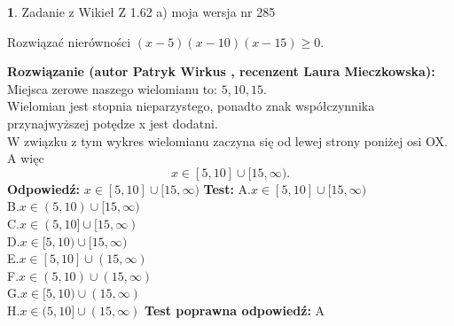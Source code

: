\documentclass[12pt, a4paper]{article}
\theoremstyle{definition} %
\newtheorem{zad}{}
\newcommand{\zadStart}[1]{\begin{zad}#1\newline}
\newcommand{\zadStop}{\end{zad}}
\newcommand{\rozwStart}[2]{\noindent \textbf{Rozwiązanie (autor #1 , recenzent #2): }\newline}
\newcommand{\rozwStop}{\newline}
\newcommand{\odpStart}{\noindent \textbf{Odpowiedź:}\newline}
\newcommand{\odpStop}{\newline}
\newcommand{\testStart}{\noindent \textbf{Test:}\newline}
\newcommand{\testStop}{\newline}
\newcommand{\kluczStart}{\noindent \textbf{Test poprawna odpowiedź:}\newline}
\newcommand{\kluczStop}{\newline}
\begin{document}
\zadStart{Zadanie z Wikieł Z 1.62 a) moja wersja nr 285}

Rozwiązać nierówności $(x-5)(x-10)(x-15)\ge0$.
\zadStop
\rozwStart{Patryk Wirkus}{Laura Mieczkowska}
Miejsca zerowe naszego wielomianu to: $5, 10, 15$.\\
Wielomian jest stopnia nieparzystego, ponadto znak współczynnika przy\linebreak najwyższej potędze x jest dodatni.\\ W związku z tym wykres wielomianu zaczyna się od lewej strony poniżej osi OX. A więc $$x \in [5,10] \cup [15,\infty).$$
\rozwStop
\odpStart
$x \in [5,10] \cup [15,\infty)$
\odpStop
\testStart
A.$x \in [5,10] \cup [15,\infty)$\\
B.$x \in (5,10) \cup [15,\infty)$\\
C.$x \in (5,10] \cup [15,\infty)$\\
D.$x \in [5,10) \cup [15,\infty)$\\
E.$x \in [5,10] \cup (15,\infty)$\\
F.$x \in (5,10) \cup (15,\infty)$\\
G.$x \in [5,10) \cup (15,\infty)$\\
H.$x \in (5,10] \cup (15,\infty)$
\testStop
\kluczStart
A
\kluczStop
\end{document}
